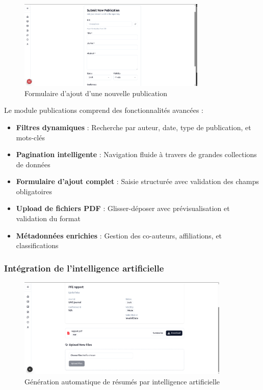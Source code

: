 \documentclass{rapportPfe}
\begin{document}
\begin{figure}[H]
    \centering
    \includegraphics[width=0.8\textwidth]{diagrams/a_ss_11.png}
    \caption{Formulaire d'ajout d'une nouvelle publication}
    \label{fig:add_publication}
\end{figure}

Le module publications comprend des fonctionnalités avancées :
\begin{itemize}
    \item \textbf{Filtres dynamiques} : Recherche par auteur, date, type de publication, et mots-clés
    \item \textbf{Pagination intelligente} : Navigation fluide à travers de grandes collections de données
    \item \textbf{Formulaire d'ajout complet} : Saisie structurée avec validation des champs obligatoires
    \item \textbf{Upload de fichiers PDF} : Glisser-déposer avec prévisualisation et validation du format
    \item \textbf{Métadonnées enrichies} : Gestion des co-auteurs, affiliations, et classifications
\end{itemize}

\subsubsection{Intégration de l'intelligence artificielle}

\begin{figure}[H]
    \centering
    \includegraphics[width=0.9\textwidth]{diagrams/a_ss_13.png}
    \caption{Génération automatique de résumés par intelligence artificielle}
    \label{fig:ai_summary}
\end{figure}
\end{document}
